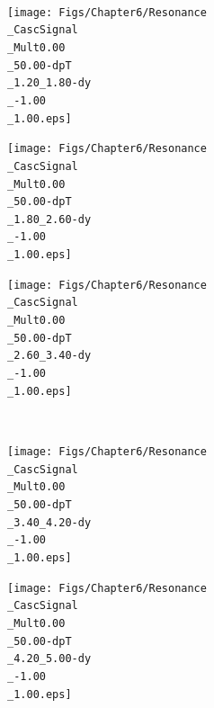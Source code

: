 {\begin{landscape}
\begin{figure}[p]
\begin{minipage}[t]{.3\textwidth}
    \end{minipage} \\
    \begin{minipage}[t]{.3\textwidth}
        \hspace*{-2.cm}
        \texttt{[image: Figs/Chapter6/Resonance\\\_CascSignal\\\_Mult0.00\\\_50.00-dpT\\\_1.20\_1.80-dy\\\_-1.00\\\_1.00.eps]}
    \end{minipage}
    \hfill
    \begin{minipage}[t]{.3\textwidth}
		\hspace*{-3.cm}
        \texttt{[image: Figs/Chapter6/Resonance\\\_CascSignal\\\_Mult0.00\\\_50.00-dpT\\\_1.80\_2.60-dy\\\_-1.00\\\_1.00.eps]}
    \end{minipage}
    \hfill
    \begin{minipage}[t]{.3\textwidth}
		\hspace*{-4.cm}
        \texttt{[image: Figs/Chapter6/Resonance\\\_CascSignal\\\_Mult0.00\\\_50.00-dpT\\\_2.60\_3.40-dy\\\_-1.00\\\_1.00.eps]}
    \end{minipage}  \\
    \begin{minipage}[t]{.3\textwidth}
        \hspace*{-2.cm}
        \texttt{[image: Figs/Chapter6/Resonance\\\_CascSignal\\\_Mult0.00\\\_50.00-dpT\\\_3.40\_4.20-dy\\\_-1.00\\\_1.00.eps]}
    \end{minipage}
    \hfill
    \begin{minipage}[t]{.3\textwidth}
		\hspace*{-3.cm}
        \texttt{[image: Figs/Chapter6/Resonance\\\_CascSignal\\\_Mult0.00\\\_50.00-dpT\\\_4.20\_5.00-dy\\\_-1.00\\\_1.00.eps]}

\end{minipage}
\end{figure}
\end{landscape}}
